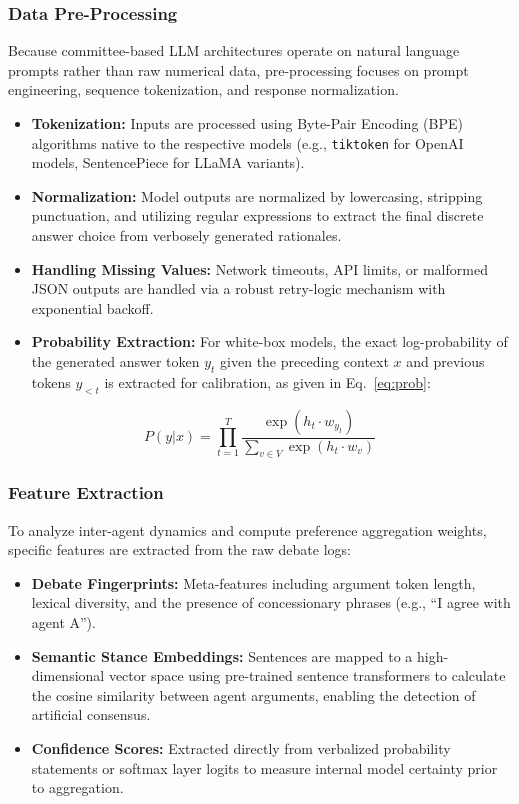 \documentclass[a4paper,fleqn]{cas-sc}
\begin{document}
\subsubsection{Data Pre-Processing}
Because committee-based LLM architectures operate on natural language prompts rather than raw numerical data, pre-processing focuses on prompt engineering, sequence tokenization, and response normalization.
\begin{itemize}
    \item \textbf{Tokenization:} Inputs are processed using Byte-Pair Encoding (BPE) algorithms native to the respective models (e.g., \texttt{tiktoken} for OpenAI models, SentencePiece for LLaMA variants).
    \item \textbf{Normalization:} Model outputs are normalized by lowercasing, stripping punctuation, and utilizing regular expressions to extract the final discrete answer choice from verbosely generated rationales.
    \item \textbf{Handling Missing Values:} Network timeouts, API limits, or malformed JSON outputs are handled via a robust retry-logic mechanism with exponential backoff.
    \item \textbf{Probability Extraction:} For white-box models, the exact log-probability of the generated answer token $y_t$ given the preceding context $x$ and previous tokens $y_{<t}$ is extracted for calibration, as given in Eq.~\eqref{eq:prob}:
\end{itemize}
\begin{equation}
    P(y|x) = \prod_{t=1}^{T} \frac{\exp(h_t \cdot w_{y_t})}{\sum_{v \in V} \exp(h_t \cdot w_v)}
    \label{eq:prob}
\end{equation}

\subsubsection{Feature Extraction}
To analyze inter-agent dynamics and compute preference aggregation weights, specific features are extracted from the raw debate logs:
\begin{itemize}
    \item \textbf{Debate Fingerprints:} Meta-features including argument token length, lexical diversity, and the presence of concessionary phrases (e.g., ``I agree with agent A'').
    \item \textbf{Semantic Stance Embeddings:} Sentences are mapped to a high-dimensional vector space using pre-trained sentence transformers to calculate the cosine similarity between agent arguments, enabling the detection of artificial consensus.
    \item \textbf{Confidence Scores:} Extracted directly from verbalized probability statements or softmax layer logits to measure internal model certainty prior to aggregation.
\end{itemize}
\end{document}
